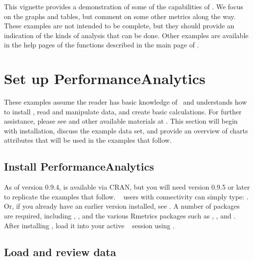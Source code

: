 \documentclass[12pt,letterpaper,english]{article}
\begin{document}
This vignette provides a demonstration of some of the capabilities
of . We focus on the graphs and tables, but
comment on some other metrics along the way. These examples are not
intended to be complete, but they should provide an indication of
the kinds of analysis that can be done. Other examples are available
in the help pages of the functions described in the main page of
.


\section{Set up PerformanceAnalytics}

These examples assume the reader has basic knowledge of \R ~and
understands how to install \R, read and manipulate data, and create
basic calculations. For further assistance, please see 
and other available materials at .
This section will begin with installation, discuss the example data
set, and provide an overview of charts attributes that will be used
in the examples that follow.


\subsection{Install PerformanceAnalytics}

As of version 0.9.4,  is available
via CRAN, but you will need version 0.9.5 or later to replicate the examples
that follow.  \R~ users with connectivity can simply type:
.  Or, if you
already have an earlier version installed, see .
A number of packages are required, including , ,
and the various Rmetrics packages such as , ,
and . After installing ,
load it into your active \R~ session using .



\subsection{Load and review data}
\end{document}
